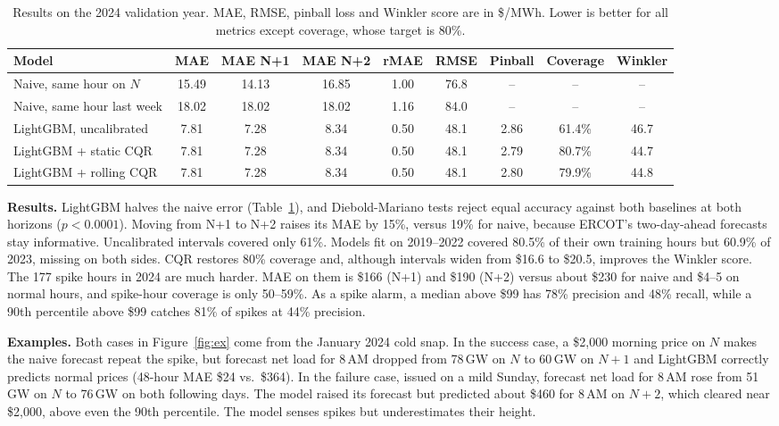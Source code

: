 \documentclass[11pt]{article}
\begin{document}
\begin{table}[h]
\centering\small
\begin{tabular}{lcccccccc}
\toprule
Model & MAE & MAE N+1 & MAE N+2 & rMAE & RMSE & Pinball & Coverage & Winkler \\
\midrule
Naive, same hour on $N$ & 15.49 & 14.13 & 16.85 & 1.00 & 76.8 & -- & -- & -- \\
Naive, same hour last week & 18.02 & 18.02 & 18.02 & 1.16 & 84.0 & -- & -- & -- \\
LightGBM, uncalibrated & 7.81 & 7.28 & 8.34 & 0.50 & 48.1 & 2.86 & 61.4\% & 46.7 \\
LightGBM + static CQR & 7.81 & 7.28 & 8.34 & 0.50 & 48.1 & 2.79 & 80.7\% & 44.7 \\
LightGBM + rolling CQR & 7.81 & 7.28 & 8.34 & 0.50 & 48.1 & 2.80 & 79.9\% & 44.8 \\
\bottomrule
\end{tabular}
\caption{Results on the 2024 validation year. MAE, RMSE, pinball loss and Winkler score are in \$/MWh. Lower is better for all metrics except coverage, whose target is 80\%.}
\label{tab:results}
\end{table}

\vspace{-0.5em}
\textbf{Results.} LightGBM halves the naive error (Table~\ref{tab:results}), and Diebold-Mariano tests reject equal accuracy against both baselines at both horizons ($p<0.0001$). Moving from N+1 to N+2 raises its MAE by 15\%, versus 19\% for naive, because ERCOT's two-day-ahead forecasts stay informative. Uncalibrated intervals covered only 61\%. Models fit on 2019--2022 covered 80.5\% of their own training hours but 60.9\% of 2023, missing on both sides. CQR restores 80\% coverage and, although intervals widen from \$16.6 to \$20.5, improves the Winkler score. The 177 spike hours in 2024 are much harder. MAE on them is \$166 (N+1) and \$190 (N+2) versus about \$230 for naive and \$4--5 on normal hours, and spike-hour coverage is only 50--59\%. As a spike alarm, a median above \$99 has 78\% precision and 48\% recall, while a 90th percentile above \$99 catches 81\% of spikes at 44\% precision.

\textbf{Examples.} Both cases in Figure~\ref{fig:ex} come from the January 2024 cold snap. In the success case, a \$2{,}000 morning price on $N$ makes the naive forecast repeat the spike, but forecast net load for 8\,AM dropped from 78\,GW on $N$ to 60\,GW on $N{+}1$ and LightGBM correctly predicts normal prices (48-hour MAE \$24 vs.\ \$364). In the failure case, issued on a mild Sunday, forecast net load for 8\,AM rose from 51\,GW on $N$ to 76\,GW on both following days. The model raised its forecast but predicted about \$460 for 8\,AM on $N{+}2$, which cleared near \$2{,}000, above even the 90th percentile. The model senses spikes but underestimates their height.
\end{document}
